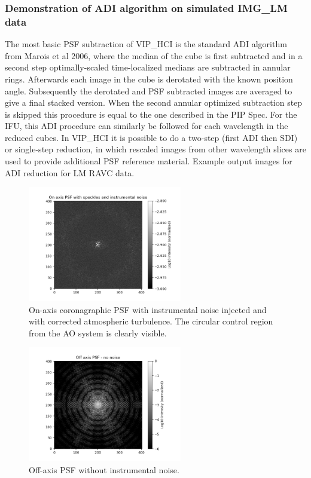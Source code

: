 \subsubsection{Demonstration of ADI algorithm on simulated IMG\_LM data}
The most basic PSF subtraction of VIP\_HCI is the standard ADI algorithm from Marois et al 2006, where the median of the cube is first subtracted and in a second step optimally-scaled time-localized medians are subtracted in annular rings. Afterwards each image in the cube is derotated with the known position angle. Subsequently the derotated and PSF subtracted images are averaged to give a final stacked version. When the second annular optimized subtraction step is skipped this procedure is equal to the one described in the PIP Spec.
For the IFU, this ADI procedure can similarly be followed for each wavelength in the reduced cubes. In VIP\_HCI it is possible to do a two-step (first ADI then SDI) or single-step reduction, in which rescaled images from other wavelength slices are used to provide additional PSF reference material.
Example output images for ADI reduction for LM RAVC data.


\begin{figure}[!ht]
  \centering
  \includegraphics[width=0.6\textwidth]{./figures/onaxis_psf.png}
  \caption[On-axis coronagraphic PSF with instrumental noise and corrected turbulence]{%
    On-axis coronagraphic PSF with instrumental noise injected and with corrected atmospheric turbulence.
    The circular control region from the AO system is clearly visible.
  }
\end{figure}
\begin{figure}[!ht]
  \centering
  \includegraphics[width=0.6\textwidth]{./figures/offaxis_psf.png}
  \caption{Off-axis PSF without instrumental noise.}
\end{figure}

